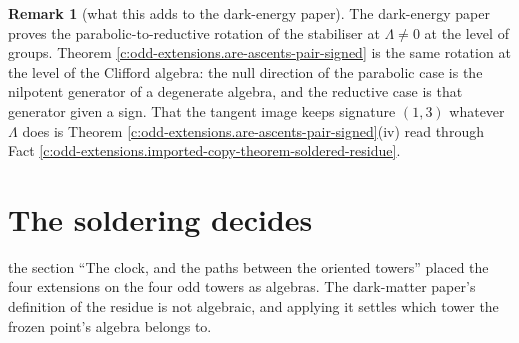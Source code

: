 \documentclass[11pt]{article}
\theoremstyle{definition}
\newtheorem{remark}[theorem]{Remark}
\theoremstyle{plain}
\begin{document}
\begin{remark}[what this adds to the dark-energy paper]\label{c:note.odd-extensions.what-adds-dark-energy-paper}
The dark-energy paper proves the parabolic-to-reductive rotation of the stabiliser at $\Lambda \neq 0$ at the level of groups. Theorem \ref{c:odd-extensions.are-ascents-pair-signed} is the same rotation at the level of the Clifford algebra: the null direction of the parabolic case is the nilpotent generator of a degenerate algebra, and the reductive case is that generator given a sign. That the tangent image keeps signature $(1,3)$ whatever $\Lambda$ does is Theorem \ref{c:odd-extensions.are-ascents-pair-signed}(iv) read through Fact \ref{c:odd-extensions.imported-copy-theorem-soldered-residue}.
\end{remark}

\section{The soldering decides}

\label{c:note.odd-extensions.setting-soldering-decides}
the section ``The clock, and the paths between the oriented towers'' placed the four extensions on the four odd towers as algebras. The dark-matter paper's definition of the residue is not algebraic, and applying it settles which tower the frozen point's algebra belongs to.
\end{document}
